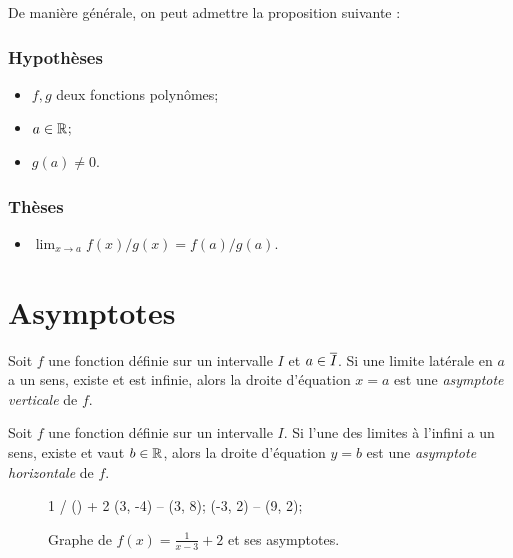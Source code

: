 \documentclass[main.tex]{subfiles}
\begin{document}
De manière générale, on peut admettre la proposition suivante :

\begin{proposition}

    \subsubsection{Hypothèses}
    \begin{itemize}
        \item $f, g$ deux fonctions polynômes;
        \item $a \in \mathbb{R}$;
        \item $g(a) \ne 0$.
    \end{itemize}

    \subsubsection{Thèses}
    \begin{itemize}
        \item $\lim_{x \to a} f(x)/g(x) = f(a)/g(a)$.
    \end{itemize}
\end{proposition}

\section{Asymptotes}

\begin{definition}

    Soit $f$ une fonction définie sur un intervalle $I$ et $a \in \overline{I}$.
    Si une limite latérale en $a$ a un sens, existe et est infinie,
    alors la droite d'équation $x = a$ est
    une \emph{asymptote verticale} de $f$.
\end{definition}

\begin{definition}

    Soit $f$ une fonction définie sur un intervalle $I$.
    Si l'une des limites à l'infini a un sens, existe et vaut $b \in \mathbb{R}$,
    alors la droite d'équation $y = b$ est
    une \emph{asymptote horizontale} de $f$.
\end{definition}

\begin{figure}
    \centering
    \begin{plot}{0.5}{-3}{-4}{9}{8}
         {1 / () + 2}
        \drawline (3, -4) -- (3, 8);
        \drawline (-3, 2) -- (9, 2);
    \end{plot}
    \caption{Graphe de $f(x) = \frac 1 {x - 3} + 2$ et ses asymptotes.}
\end{figure}
\end{document}
